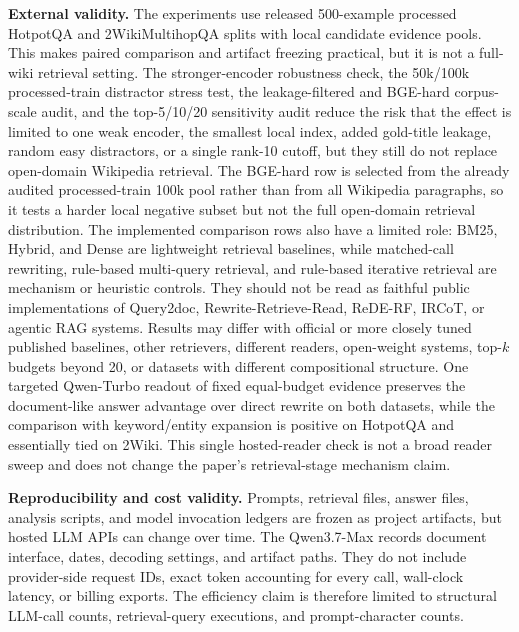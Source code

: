 \textbf{External validity.} The experiments use released 500-example processed HotpotQA and 2WikiMultihopQA splits with local candidate evidence pools. This makes paired comparison and artifact freezing practical, but it is not a full-wiki retrieval setting. The stronger-encoder robustness check, the 50k/100k processed-train distractor stress test, the leakage-filtered and BGE-hard corpus-scale audit, and the top-5/10/20 sensitivity audit reduce the risk that the effect is limited to one weak encoder, the smallest local index, added gold-title leakage, random easy distractors, or a single rank-10 cutoff, but they still do not replace open-domain Wikipedia retrieval. The BGE-hard row is selected from the already audited processed-train 100k pool rather than from all Wikipedia paragraphs, so it tests a harder local negative subset but not the full open-domain retrieval distribution. The implemented comparison rows also have a limited role: BM25, Hybrid, and Dense are lightweight retrieval baselines, while matched-call rewriting, rule-based multi-query retrieval, and rule-based iterative retrieval are mechanism or heuristic controls. They should not be read as faithful public implementations of Query2doc, Rewrite-Retrieve-Read, ReDE-RF, IRCoT, or agentic RAG systems. Results may differ with official or more closely tuned published baselines, other retrievers, different readers, open-weight systems, top-$k$ budgets beyond 20, or datasets with different compositional structure. One targeted Qwen-Turbo readout of fixed equal-budget evidence preserves the document-like answer advantage over direct rewrite on both datasets, while the comparison with keyword/entity expansion is positive on HotpotQA and essentially tied on 2Wiki. This single hosted-reader check is not a broad reader sweep and does not change the paper's retrieval-stage mechanism claim.

\textbf{Reproducibility and cost validity.} Prompts, retrieval files, answer files, analysis scripts, and model invocation ledgers are frozen as project artifacts, but hosted LLM APIs can change over time. The Qwen3.7-Max records document interface, dates, decoding settings, and artifact paths. They do not include provider-side request IDs, exact token accounting for every call, wall-clock latency, or billing exports. The efficiency claim is therefore limited to structural LLM-call counts, retrieval-query executions, and prompt-character counts.
